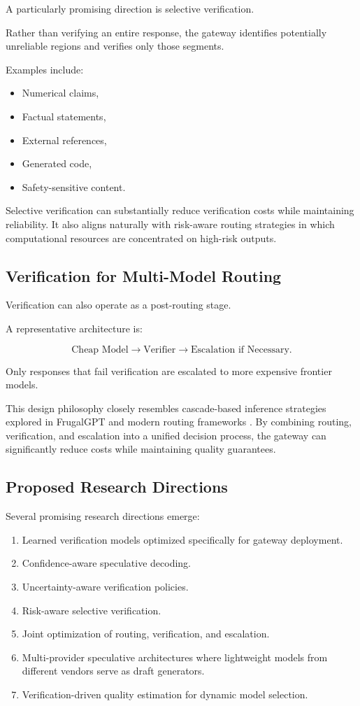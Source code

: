 \documentclass[11pt,a4paper]{article}
\begin{document}
A particularly promising direction is selective verification.

Rather than verifying an entire response, the gateway identifies potentially unreliable regions and verifies only those segments.

Examples include:

\begin{itemize}
\item Numerical claims,
\item Factual statements,
\item External references,
\item Generated code,
\item Safety-sensitive content.
\end{itemize}

Selective verification can substantially reduce verification costs while maintaining reliability. It also aligns naturally with risk-aware routing strategies in which computational resources are concentrated on high-risk outputs.

\subsection{Verification for Multi-Model Routing}

Verification can also operate as a post-routing stage.

A representative architecture is:

\[
\text{Cheap Model}
\rightarrow
\text{Verifier}
\rightarrow
\text{Escalation if Necessary}.
\]

Only responses that fail verification are escalated to more expensive frontier models.

This design philosophy closely resembles cascade-based inference strategies explored in FrugalGPT and modern routing frameworks \cite{frugalgpt,routellm}. By combining routing, verification, and escalation into a unified decision process, the gateway can significantly reduce costs while maintaining quality guarantees.

\subsection{Proposed Research Directions}

Several promising research directions emerge:

\begin{enumerate}
\item Learned verification models optimized specifically for gateway deployment.
\item Confidence-aware speculative decoding.
\item Uncertainty-aware verification policies.
\item Risk-aware selective verification.
\item Joint optimization of routing, verification, and escalation.
\item Multi-provider speculative architectures where lightweight models from different vendors serve as draft generators.
\item Verification-driven quality estimation for dynamic model selection.
\end{enumerate}
\end{document}
